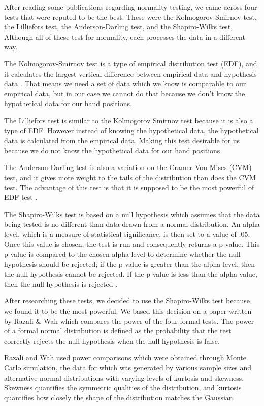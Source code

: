 \documentclass[letterpaper,english, 12pt]{article}
\begin{document}
After reading some publications regarding normality testing, we came across four tests that were reputed to be the best. These were the Kolmogorov-Smirnov test, the Lilliefors test, the Anderson-Darling test, and the Shapiro-Wilks test, Although all of these test for normality, each processes the data in a different way.

The Kolmogorov-Smirnov test is a type of empirical distribution test (EDF), and it calculates the largest vertical difference between empirical data and hypothesis data \cite{cit8}. That means we need a set of data which we know is comparable to our empirical data, but in our case we cannot do that because we don't know the hypothetical data for our hand positions. 

The Lilliefors test is similar to the Kolmogorov Smirnov test because it is also a type of EDF. However instead of knowing the hypothetical data, the hypothetical data is calculated from the empirical data. Making this test desirable for us because we do not know the hypothetical data for our hand positions \cite{cit7}

The Anderson-Darling test is also a variation on the Cramer Von Mises (CVM) test, and it gives more weight to the tails of the distribution than does the CVM test. The advantage of this test is that it is supposed to be the most powerful of EDF test \cite{cit10}.


The Shapiro-Wilks test is based on a null hypothesis which assumes that the data being tested is no different than data drawn from a normal distribution. An alpha level, which is a measure of statistical significance, is then set to a value of .05. Once this value is chosen, the test is run and consequently returns a p-value. This p-value is compared to the chosen alpha level to determine whether the null hypothesis should be rejected; if the p-value is greater than the alpha level, then the null hypothesis cannot be rejected. If the p-value is less than the alpha value, then the null hypothesis is rejected \cite{cit2}.


After researching these tests, we decided to use the Shapiro-Wilks test because we found it to be the most powerful. We based this decision on a paper written by Razali \& Wah \cite{cit1} which compares the power of the four formal tests. The power of a formal normal distribution is defined as the probability that the test correctly rejects the null hypothesis when the null hypothesis is false. 

Razali and Wah used power comparisons which were obtained through Monte Carlo simulation, the data for which was generated by various sample sizes and alternative normal distributions with varying levels of kurtosis and skewness.  Skewness quantifies the symmetric qualities of the distribution, and kurtosis quantifies how closely the shape of the distribution matches the Gaussian.  
\end{document}
